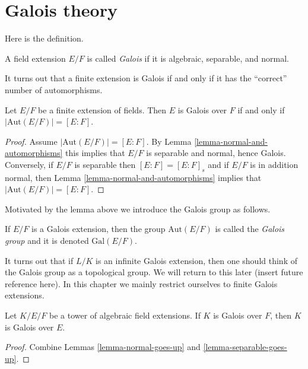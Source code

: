 \section{Galois theory}
\label{section-galois-theory}

\noindent
Here is the definition.

\begin{definition}
\label{definition-galois}
A field extension $E/F$ is called {\it Galois} if it is algebraic,
separable, and normal.
\end{definition}

\noindent
It turns out that a finite extension is Galois if and only if it has
the ``correct'' number of automorphisms.

\begin{lemma}
\label{lemma-finite-Galois}
Let $E/F$ be a finite extension of fields. Then $E$ is Galois over $F$
if and only if $|\text{Aut}(E/F)| = [E : F]$.
\end{lemma}

\begin{proof}
Assume $|\text{Aut}(E/F)| = [E : F]$. By
Lemma \ref{lemma-normal-and-automorphisms} this implies
that $E/F$ is separable and normal, hence Galois.
Conversely, if $E/F$ is separable then $[E : F] = [E : F]_s$ and
if $E/F$ is in addition normal, then
Lemma \ref{lemma-normal-and-automorphisms} implies that
$|\text{Aut}(E/F)| = [E : F]$.
\end{proof}

\noindent
Motivated by the lemma above we introduce the Galois group as follows.

\begin{definition}
\label{definition-galois-group}
If $E/F$ is a Galois extension, then the group $\text{Aut}(E/F)$ is
called the {\it Galois group} and it is denoted $\text{Gal}(E/F)$.
\end{definition}

\noindent
It turns out that if $L/K$ is an infinite Galois extension, then
one should think of the Galois group as a topological group.
We will return to this later (insert future reference here).
In this chapter we mainly restrict ourselves to finite Galois extensions.

\begin{lemma}
\label{lemma-galois-goes-up}
Let $K/E/F$ be a tower of algebraic field extensions.
If $K$ is Galois over $F$, then $K$ is Galois over $E$.
\end{lemma}

\begin{proof}
Combine Lemmas \ref{lemma-normal-goes-up} and \ref{lemma-separable-goes-up}.
\end{proof}

